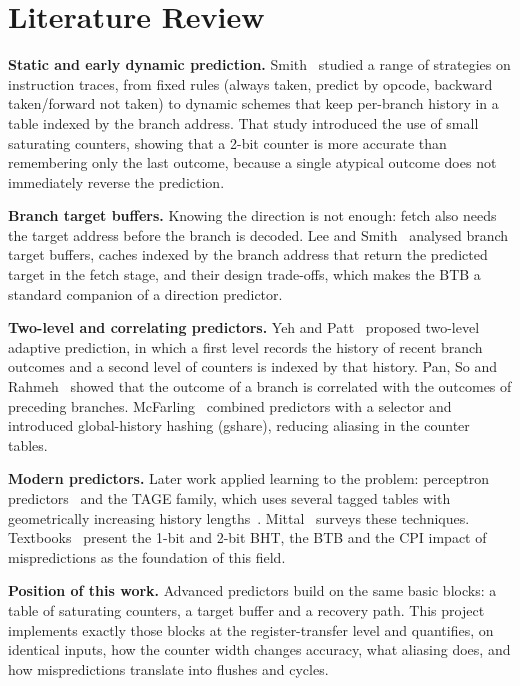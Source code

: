 \documentclass[conference]{IEEEtran}
\begin{document}
\section{Literature Review}
\label{sec:lit}
\textbf{Static and early dynamic prediction.} Smith~\cite{smith1981study} studied a range of
strategies on instruction traces, from fixed rules (always taken, predict by opcode, backward
taken/forward not taken) to dynamic schemes that keep per-branch history in a table indexed by
the branch address. That study introduced the use of small saturating counters, showing that a
2-bit counter is more accurate than remembering only the last outcome, because a single atypical
outcome does not immediately reverse the prediction.

\textbf{Branch target buffers.} Knowing the direction is not enough: fetch also needs the target
address before the branch is decoded. Lee and Smith~\cite{lee1984branch} analysed branch target
buffers, caches indexed by the branch address that return the predicted target in the fetch
stage, and their design trade-offs, which makes the BTB a standard companion of a direction
predictor.

\textbf{Two-level and correlating predictors.} Yeh and Patt~\cite{yeh1991two,yeh1993comparison}
proposed two-level adaptive prediction, in which a first level records the history of recent
branch outcomes and a second level of counters is indexed by that history. Pan, So and
Rahmeh~\cite{pan1992improving} showed that the outcome of a branch is correlated with the outcomes
of preceding branches. McFarling~\cite{mcfarling1993combining} combined predictors with a
selector and introduced global-history hashing (gshare), reducing aliasing in the counter tables.

\textbf{Modern predictors.} Later work applied learning to the problem: perceptron
predictors~\cite{jimenez2001dynamic} and the TAGE family, which uses several tagged tables with
geometrically increasing history lengths~\cite{seznec2006case}. Mittal~\cite{mittal2019survey}
surveys these techniques. Textbooks~\cite{hennessy2017ca,patterson2020cod} present the 1-bit and
2-bit BHT, the BTB and the CPI impact of mispredictions as the foundation of this field.

\textbf{Position of this work.} Advanced predictors build on the same basic blocks: a table of
saturating counters, a target buffer and a recovery path. This project implements exactly those
blocks at the register-transfer level and quantifies, on identical inputs, how the counter width
changes accuracy, what aliasing does, and how mispredictions translate into flushes and cycles.
\end{document}
